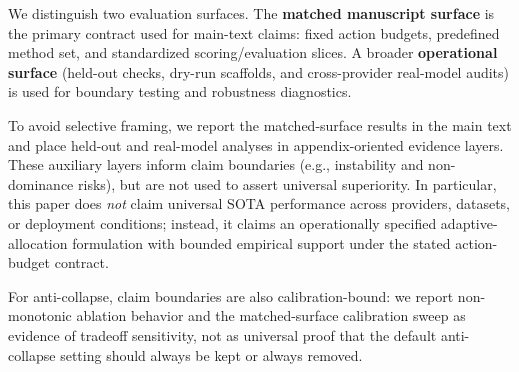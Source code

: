 We distinguish two evaluation surfaces. The \textbf{matched manuscript surface} is the primary contract used for main-text claims: fixed action budgets, predefined method set, and standardized scoring/evaluation slices. A broader \textbf{operational surface} (held-out checks, dry-run scaffolds, and cross-provider real-model audits) is used for boundary testing and robustness diagnostics.

To avoid selective framing, we report the matched-surface results in the main text and place held-out and real-model analyses in appendix-oriented evidence layers. These auxiliary layers inform claim boundaries (e.g., instability and non-dominance risks), but are not used to assert universal superiority. In particular, this paper does \emph{not} claim universal SOTA performance across providers, datasets, or deployment conditions; instead, it claims an operationally specified adaptive-allocation formulation with bounded empirical support under the stated action-budget contract.

For anti-collapse, claim boundaries are also calibration-bound: we report non-monotonic ablation behavior and the matched-surface calibration sweep as evidence of tradeoff sensitivity, not as universal proof that the default anti-collapse setting should always be kept or always removed.
